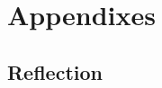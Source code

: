 \documentclass{article}
\begin{document}
\section{Appendixes}
\subsection{Reflection}

\end{document}
